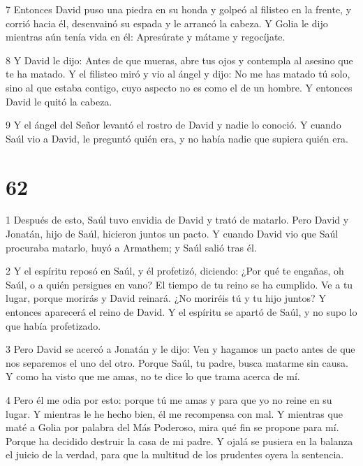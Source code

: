 \par 7 Entonces David puso una piedra en su honda y golpeó al filisteo en la frente, y corrió hacia él, desenvainó su espada y le arrancó la cabeza. Y Golia le dijo mientras aún tenía vida en él: Apresúrate y mátame y regocíjate.

\par 8 Y David le dijo: Antes de que mueras, abre tus ojos y contempla al asesino que te ha matado. Y el filisteo miró y vio al ángel y dijo: No me has matado tú solo, sino al que estaba contigo, cuyo aspecto no es como el de un hombre. Y entonces David le quitó la cabeza.

\par 9 Y el ángel del Señor levantó el rostro de David y nadie lo conoció. Y cuando Saúl vio a David, le preguntó quién era, y no había nadie que supiera quién era.

\chapter{62}

\par 1 Después de esto, Saúl tuvo envidia de David y trató de matarlo. Pero David y Jonatán, hijo de Saúl, hicieron juntos un pacto. Y cuando David vio que Saúl procuraba matarlo, huyó a Armathem; y Saúl salió tras él.

\par 2 Y el espíritu reposó en Saúl, y él profetizó, diciendo: ¿Por qué te engañas, oh Saúl, o a quién persigues en vano? El tiempo de tu reino se ha cumplido. Ve a tu lugar, porque morirás y David reinará. ¿No moriréis tú y tu hijo juntos? Y entonces aparecerá el reino de David. Y el espíritu se apartó de Saúl, y no supo lo que había profetizado.

\par 3 Pero David se acercó a Jonatán y le dijo: Ven y hagamos un pacto antes de que nos separemos el uno del otro. Porque Saúl, tu padre, busca matarme sin causa. Y como ha visto que me amas, no te dice lo que trama acerca de mí.

\par 4 Pero él me odia por esto: porque tú me amas y para que yo no reine en su lugar. Y mientras le he hecho bien, él me recompensa con mal. Y mientras que maté a Golia por palabra del Más Poderoso, mira qué fin se propone para mí. Porque ha decidido destruir la casa de mi padre. Y ojalá se pusiera en la balanza el juicio de la verdad, para que la multitud de los prudentes oyera la sentencia.

